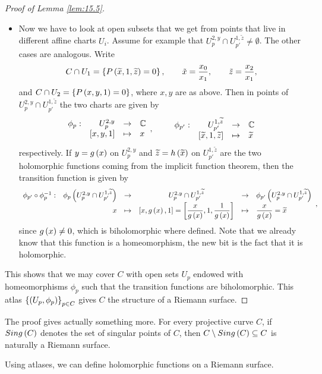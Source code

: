 \begin{proof}[Proof of Lemma \ref{lem:15.5}]
\begin{itemize}
\item Now we have to look at open subsets that we get from points that live in different affine charts $ U_i $. Assume for example that $ U_p^{2, y} \cap U_{p'}^{1, \widetilde{z}} \ne \emptyset $. The other cases are analogous. Write
$$ C \cap U_1 = \left\{ P\left( \widetilde{x}, 1, \widetilde{z} \right) = 0 \right\}, \qquad \tilde{x} = \dfrac{x_0}{x_1}, \qquad \tilde{z} = \dfrac{x_2}{x_1}, $$
and $ C \cap U_2 = \left\{ P\left( x, y, 1 \right) = 0 \right\} $, where $ x, y $ are as above. Then in points of $ U_p^{2, y} \cap U_{p'}^{1, \widetilde{z}} $ the two charts are given by
$$ \function[\phi_p]{U_p^{2, y}}{\C}{\sb{x, y, 1}}{x}, \qquad \function[\phi_{p'}]{U_{p'}^{1, \widetilde{z}}}{\C}{\sb{\widetilde{x}, 1, \widetilde{z}}}{\widetilde{x}} $$
respectively. If $ y = g\left( x \right) $ on $ U_p^{2, y} $ and $ \widetilde{z} = h\left( \widetilde{x} \right) $ on $ U_{p'}^{1, \widetilde{z}} $ are the two holomorphic functions coming from the implicit function theorem, then the transition function is given by
$$
\begin{array}{crcccl}
\phi_{p'} \circ \phi_p^{-1} : & \phi_p\left( U_p^{2, y} \cap U_{p'}^{1, \widetilde{z}} \right) & \to & U_p^{2, y} \cap U_{p'}^{1, \widetilde{z}} & \to & \phi_{p'}\left( U_p^{2, y} \cap U_{p'}^{1, \widetilde{z}} \right) \\
& x & \mapsto & \left[ x, g\left( x \right), 1 \right] = \left[ \dfrac{x}{g\left( x \right)}, 1, \dfrac{1}{g\left( x \right)} \right] & \mapsto & \dfrac{x}{g\left( x \right)} = \widetilde{x}
\end{array},
$$
since $ g\left( x \right) \ne 0 $, which is biholomorphic where defined. Note that we already know that this function is a homeomorphism, the new bit is the fact that it is holomorphic.
\end{itemize}
This shows that we may cover $ C $ with open sets $ U_p $ endowed with homeomorphisms $ \phi_p $ such that the transition functions are biholomorphic. This atlas $ \left\{ \left( U_p, \phi_p \right) \right\}_{p \in C} $ gives $ C $ the structure of a Riemann surface.
\end{proof}

\pagebreak


\begin{remark}
The proof gives actually something more. For every projective curve $ C $, if $ Sing\left( C \right) $ denotes the set of singular points of $ C $, then $ C \setminus Sing\left( C \right) \subseteq C $ is naturally a Riemann surface.
\end{remark}

Using atlases, we can define holomorphic functions on a Riemann surface.

